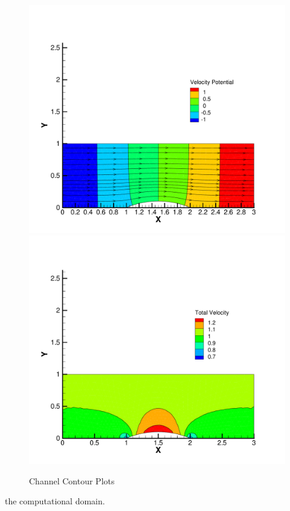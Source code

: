 \documentclass[a4paper]{article}
\begin{document}
\begin{figure}[h]
  \captionsetup[subfigure]{position=b}
  \centering
  {\includegraphics[width=0.45\linewidth]{figures/potential_contour}}
	\label{fig:potential}
  {\includegraphics[width=0.45\linewidth]{figures/Vt_contour}}
	\label{fig:Vt-contour}
  \caption{Channel Contour Plots}
\end{figure}
the computational domain.

\end{document}
